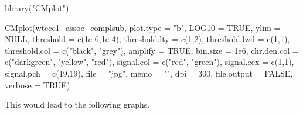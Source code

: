 \documentclass[
]{book}
\newenvironment{Shaded}{\begin{snugshade}}{\end{snugshade}}
\newcommand{\AttributeTok}[1]{\textcolor[rgb]{0.77,0.63,0.00}{#1}}
\newcommand{\ConstantTok}[1]{\textcolor[rgb]{0.00,0.00,0.00}{#1}}
\newcommand{\DecValTok}[1]{\textcolor[rgb]{0.00,0.00,0.81}{#1}}
\newcommand{\FloatTok}[1]{\textcolor[rgb]{0.00,0.00,0.81}{#1}}
\newcommand{\FunctionTok}[1]{\textcolor[rgb]{0.00,0.00,0.00}{#1}}
\newcommand{\NormalTok}[1]{#1}
\newcommand{\StringTok}[1]{\textcolor[rgb]{0.31,0.60,0.02}{#1}}
\begin{document}
\begin{Shaded}
\begin{Highlighting}[]
\FunctionTok{library}\NormalTok{(}\StringTok{"CMplot"}\NormalTok{)}

\FunctionTok{CMplot}\NormalTok{(wtccc1\_assoc\_complsub,}
       \AttributeTok{plot.type =} \StringTok{"b"}\NormalTok{, }\AttributeTok{LOG10 =} \ConstantTok{TRUE}\NormalTok{, }\AttributeTok{ylim =} \ConstantTok{NULL}\NormalTok{,}
       \AttributeTok{threshold =} \FunctionTok{c}\NormalTok{(}\FloatTok{1e{-}6}\NormalTok{,}\FloatTok{1e{-}4}\NormalTok{), }\AttributeTok{threshold.lty =} \FunctionTok{c}\NormalTok{(}\DecValTok{1}\NormalTok{,}\DecValTok{2}\NormalTok{), }\AttributeTok{threshold.lwd =} \FunctionTok{c}\NormalTok{(}\DecValTok{1}\NormalTok{,}\DecValTok{1}\NormalTok{), }\AttributeTok{threshold.col =} \FunctionTok{c}\NormalTok{(}\StringTok{"black"}\NormalTok{, }\StringTok{"grey"}\NormalTok{),}
       \AttributeTok{amplify =} \ConstantTok{TRUE}\NormalTok{,}
       \AttributeTok{bin.size =} \FloatTok{1e6}\NormalTok{, }\AttributeTok{chr.den.col =} \FunctionTok{c}\NormalTok{(}\StringTok{"darkgreen"}\NormalTok{, }\StringTok{"yellow"}\NormalTok{, }\StringTok{"red"}\NormalTok{),}
       \AttributeTok{signal.col =} \FunctionTok{c}\NormalTok{(}\StringTok{"red"}\NormalTok{, }\StringTok{"green"}\NormalTok{), }\AttributeTok{signal.cex =} \FunctionTok{c}\NormalTok{(}\DecValTok{1}\NormalTok{,}\DecValTok{1}\NormalTok{), }\AttributeTok{signal.pch =} \FunctionTok{c}\NormalTok{(}\DecValTok{19}\NormalTok{,}\DecValTok{19}\NormalTok{),}
       \AttributeTok{file =} \StringTok{"jpg"}\NormalTok{, }\AttributeTok{memo =} \StringTok{""}\NormalTok{, }\AttributeTok{dpi =} \DecValTok{300}\NormalTok{, }\AttributeTok{file.output =} \ConstantTok{FALSE}\NormalTok{, }\AttributeTok{verbose =} \ConstantTok{TRUE}\NormalTok{)}
\end{Highlighting}
\end{Shaded}

This would lead to the following graphs.
\end{document}

